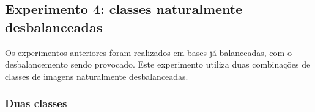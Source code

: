 

\FloatBarrier
\subsection{Experimento 4: classes naturalmente desbalanceadas}

Os experimentos anteriores foram realizados em bases já balanceadas, com o desbalancemento sendo provocado. Este experimento utiliza duas combinações de classes de imagens naturalmente desbalanceadas.


\subsubsection{Duas classes}

